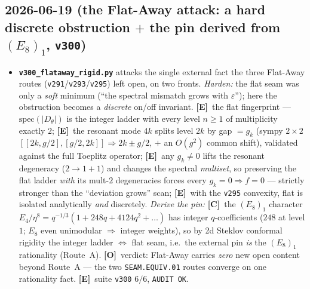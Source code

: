 \documentclass[11pt]{article}
\providecommand{\mE}{\textbf{[E]}}\providecommand{\mC}{\textbf{[C]}}
\providecommand{\mO}{\textbf{[O]}}\providecommand{\mX}{\textbf{[X]}}
\providecommand{\vref}[1]{\texttt{#1}}
\begin{document}
\subsection*{2026-06-19 (the Flat-Away attack: a hard discrete obstruction $+$ the pin derived from $(E_8)_1$, \texttt{v300})}
\begin{itemize}
\item \textbf{\texttt{v300\_flataway\_rigid.py}} attacks the single external fact the three Flat-Away routes
  (\vref{v291}/\vref{v293}/\vref{v295}) left open, on two fronts. \emph{Harden:} the flat seam was only a
  \emph{soft} minimum (``the spectral mismatch grows with $\varepsilon$''); here the obstruction becomes a
  \emph{discrete} on/off invariant. \mE\ the flat fingerprint --- $\mathrm{spec}(|D_\theta|)$ is the integer
  ladder with every level $n\ge1$ of multiplicity exactly $2$; \mE\ the resonant mode $4k$ splits level $2k$ by
  gap $=g_k$ (sympy $2\times2$ $[[2k,g/2],[g/2,2k]]\Rightarrow 2k\pm g/2$, $+$ an $O(g^2)$ common shift),
  validated against the full Toeplitz operator; \mE\ any $g_k\ne0$ lifts the resonant degeneracy
  ($2\to1{+}1$) and changes the spectral \emph{multiset}, so preserving the flat ladder \emph{with} its mult-$2$
  degeneracies forces every $g_k=0\Rightarrow f=0$ --- strictly stronger than the ``deviation grows'' scan; \mE\
  with the \vref{v295} convexity, flat is isolated analytically \emph{and} discretely. \emph{Derive the pin:} \mC\
  the $(E_8)_1$ character $E_4/\eta^8=q^{-1/3}(1+248q+4124q^2+\dots)$ has integer $q$-coefficients ($248$ at
  level $1$; $E_8$ even unimodular $\Rightarrow$ integer weights), so by 2d Steklov conformal rigidity the integer
  ladder $\Leftrightarrow$ flat seam, i.e.\ the external pin \emph{is} the $(E_8)_1$ rationality (Route~A). \mO\
  verdict: Flat-Away carries \emph{zero} new open content beyond Route~A --- the two \texttt{SEAM.EQUIV.01} routes
  converge on one rationality fact. \mE\ suite \texttt{v300} $6/6$, \texttt{AUDIT OK}.
\end{itemize}
\end{document}
